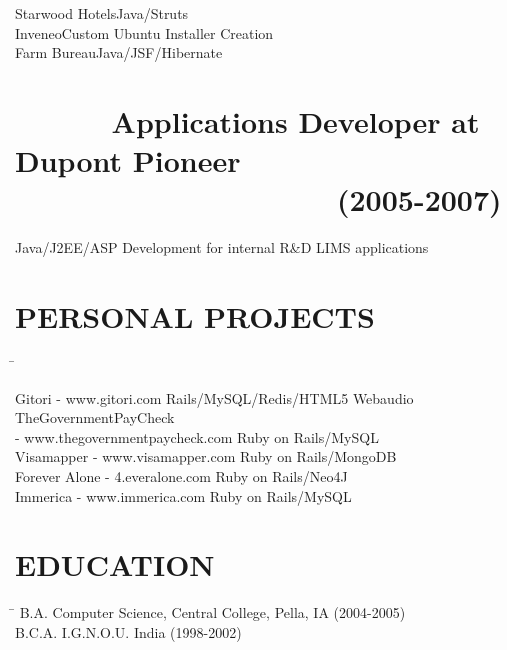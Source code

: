 \documentclass{res}
\begin{document}
\begin{resume}
\begin{tabbing}
Starwood Hotels\>Java/Struts\\

Inveneo\>Custom Ubuntu Installer Creation\\

Farm Bureau\>Java/JSF/Hibernate \\
 \end{tabbing}
\vspace{-0.4in}
\section {\ \ \ \ \ \ Applications Developer at Dupont Pioneer \textnormal{\ \ \ \ \ \ \ \ \ \ \ \  \ \ \ \ \ \ \ \ (2005-2007)}}\vspace{0.05in}
   \begin{tabbing}
Java/J2EE/ASP Development for internal R\&D LIMS applications
\end{tabbing}
\vspace{0.1in}         
\section{PERSONAL PROJECTS}  \vspace{-0.01in}   
   \begin{tabbing}
   \hspace{3.3in}\= \kill %

    Gitori - www.gitori.com   \>Rails/MySQL/Redis/HTML5 Webaudio \\

    TheGovernmentPayCheck \\- www.thegovernmentpaycheck.com   \>Ruby on Rails/MySQL\\

    Visamapper - www.visamapper.com   \>Ruby on Rails/MongoDB \\
 
    Forever Alone - 4.everalone.com \>Ruby on Rails/Neo4J \\

    Immerica - www.immerica.com \>Ruby on Rails/MySQL\\

\end{tabbing}

\section{EDUCATION}\vspace{0.05in}
\begin{tabbing}
\hspace{3.3in}\= \kill %
        B.A. Computer Science, Central College, Pella, IA  \>(2004-2005) \\
        B.C.A. I.G.N.O.U. India  \>(1998-2002) \\
\end{tabbing}
\vspace{-0.2in}

\end{resume}
\end{document}
